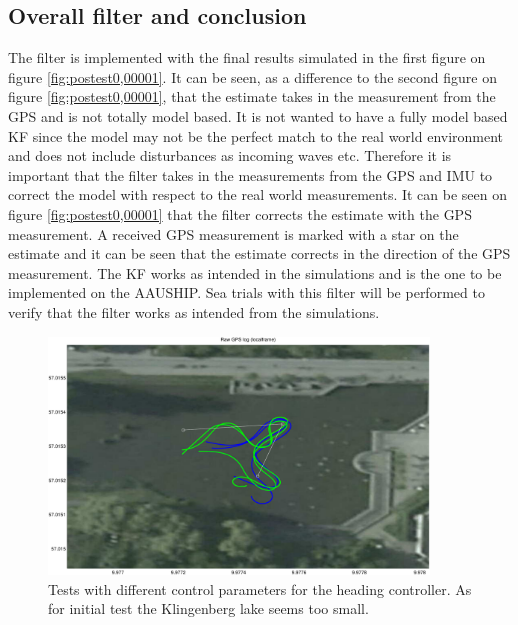 \subsection{Overall filter and conclusion}
The filter is implemented with the final results simulated in the first figure on figure \ref{fig:postest0,00001}. It can be seen, as a difference to the second figure on figure \ref{fig:postest0,00001}, that the estimate takes in the measurement from the \ac{GPS} and is not totally model based. It is not wanted to have a fully model based \ac{KF} since the model may not be the perfect match to the real world environment and does not include disturbances as incoming waves etc. Therefore it is important that the filter takes in the measurements from the \ac{GPS} and \ac{IMU} to correct the model with respect to the real world measurements. It can be seen on figure \ref{fig:postest0,00001} that the filter corrects the estimate with the \ac{GPS} measurement. A received \ac{GPS} measurement is marked with a star on the estimate and it can be seen that the estimate corrects in the direction of the \ac{GPS} measurement. The \ac{KF} works as intended in the simulations and is the one to be implemented on the AAUSHIP. Sea trials with this filter will be performed to verify that the filter works as intended from the simulations.
\begin{figure}
  \includegraphics[width=0.9\textwidth]{fig/klingenblaagroen}
  \caption{Tests with different control parameters for the heading controller. As for initial test the Klingenberg lake seems too small.}
  \label{fig:klingentest}
\end{figure}
